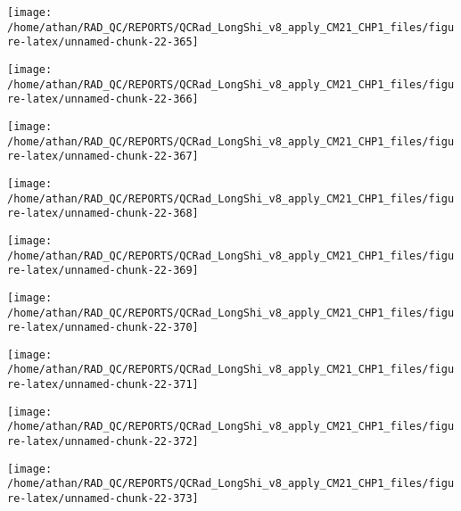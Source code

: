 \documentclass[
  10pt,
  a4paper,oneside]{article}
\begin{document}
\begin{center}\texttt{[image: /home/athan/RAD\_QC/REPORTS/QCRad\_LongShi\_v8\_apply\_CM21\_CHP1\_files/figure-latex/unnamed-chunk-22-365]} \end{center}

\begin{center}\texttt{[image: /home/athan/RAD\_QC/REPORTS/QCRad\_LongShi\_v8\_apply\_CM21\_CHP1\_files/figure-latex/unnamed-chunk-22-366]} \end{center}

\begin{center}\texttt{[image: /home/athan/RAD\_QC/REPORTS/QCRad\_LongShi\_v8\_apply\_CM21\_CHP1\_files/figure-latex/unnamed-chunk-22-367]} \end{center}

\begin{center}\texttt{[image: /home/athan/RAD\_QC/REPORTS/QCRad\_LongShi\_v8\_apply\_CM21\_CHP1\_files/figure-latex/unnamed-chunk-22-368]} \end{center}

\begin{center}\texttt{[image: /home/athan/RAD\_QC/REPORTS/QCRad\_LongShi\_v8\_apply\_CM21\_CHP1\_files/figure-latex/unnamed-chunk-22-369]} \end{center}

\begin{center}\texttt{[image: /home/athan/RAD\_QC/REPORTS/QCRad\_LongShi\_v8\_apply\_CM21\_CHP1\_files/figure-latex/unnamed-chunk-22-370]} \end{center}

\begin{center}\texttt{[image: /home/athan/RAD\_QC/REPORTS/QCRad\_LongShi\_v8\_apply\_CM21\_CHP1\_files/figure-latex/unnamed-chunk-22-371]} \end{center}

\begin{center}\texttt{[image: /home/athan/RAD\_QC/REPORTS/QCRad\_LongShi\_v8\_apply\_CM21\_CHP1\_files/figure-latex/unnamed-chunk-22-372]} \end{center}

\begin{center}\texttt{[image: /home/athan/RAD\_QC/REPORTS/QCRad\_LongShi\_v8\_apply\_CM21\_CHP1\_files/figure-latex/unnamed-chunk-22-373]} \end{center}
\end{document}
